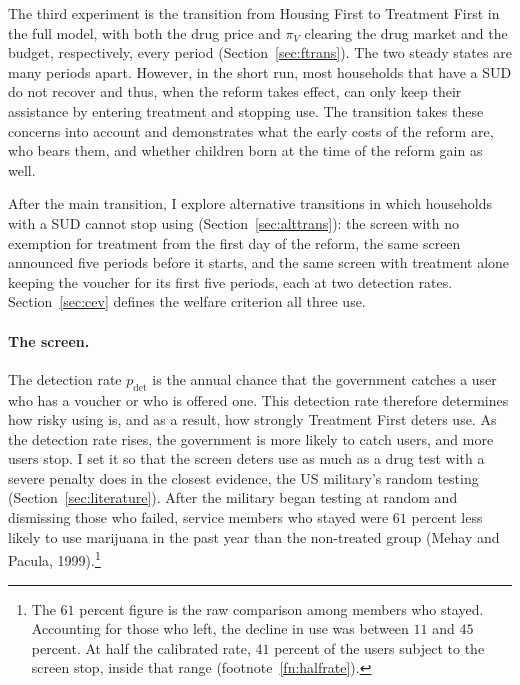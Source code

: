 \documentclass[10pt]{article}
\begin{document}
The third experiment is the transition from Housing First to Treatment First in the full model, with both the drug price and $\pi_V$ clearing the drug market and the budget, respectively, every period (Section~\ref{sec:ftrans}).   The two steady states are many periods apart. However, in the short run, most households that have a SUD do not recover and thus, when the reform takes effect, can only keep their assistance by entering treatment and stopping use. The transition takes these concerns into account and demonstrates what the early costs of the reform are, who bears them, and whether children born at the time of the reform gain as well.

After the main transition, I explore alternative transitions in which households with a SUD cannot stop using (Section~\ref{sec:alttrans}): the screen with no exemption for treatment from the first day of the reform, the same screen announced five periods before it starts, and the same screen with treatment alone keeping the voucher for its first five periods, each at two detection rates. Section~\ref{sec:cev} defines the welfare criterion all three use.

\paragraph{The screen.}    The detection rate $p_{\mathrm{det}}$ is the annual chance that the government catches a user who has a voucher or who is offered one. This detection rate therefore determines how risky using is, and as a result, how strongly Treatment First deters use. As the detection rate rises, the government is more likely to catch users, and more users stop. I  set it so that the screen deters use as much as a drug test with a severe penalty does in the closest evidence, the US military's random testing (Section~\ref{sec:literature}).  After the military began testing at random and dismissing those who failed, service members who stayed were $61$ percent less likely to use marijuana in the past year than the non-treated group (Mehay and Pacula, 1999).\footnote{  The $61$ percent figure is the raw comparison among members who stayed. Accounting for those who left, the decline in use was between $11$ and $45$ percent. At half the calibrated rate, $41$ percent of the users subject to the screen stop, inside that range (footnote~\ref{fn:halfrate}).}
\end{document}
